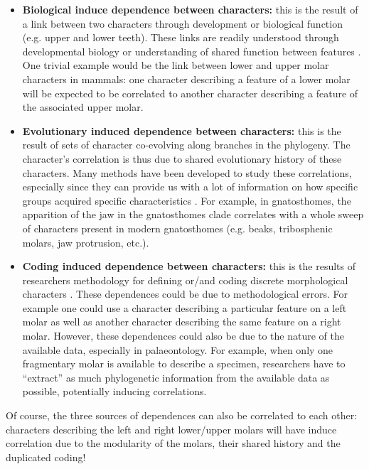 \documentclass[12pt,letterpaper]{article}
\begin{document}
\begin{itemize}
    \item \textbf{Biological induce dependence between characters:} this is the result of a link between two characters through development or biological function (e.g. upper and lower teeth).
    These links are readily understood through developmental biology or understanding of shared function between features \citep{goswami2006morphological,goswami2010,goswami2014macroevolutionary}.
    One trivial example would be the link between lower and upper molar characters in mammals: one character describing a feature of a lower molar will be expected to be correlated to another character describing a feature of the associated upper molar.

    \item \textbf{Evolutionary induced dependence between characters:} this is the result of sets of character co-evolving along branches in the phylogeny.
    The character's correlation is thus due to shared evolutionary history of these characters.
    Many methods have been developed to study these correlations, especially since they can provide us with a lot of information on how specific groups acquired specific characteristics \citep{Lande1983,Maddison1990,Pagel1994,Pagel2006,Grabowski2016}.
    For example, in gnatosthomes, the apparition of the jaw in the gnatosthomes clade correlates with a whole sweep of characters present in modern gnatosthomes (e.g. beaks, tribosphenic molars, jaw protrusion, etc.). %

    \item \textbf{Coding induced dependence between characters:} this is the results of researchers methodology for defining or/and coding discrete morphological characters \citep[see][and reference therein]{Brazeau2011}.
    These dependences could be due to methodological errors. 
    For example one could use a character describing a particular feature on a left molar as well as another character describing the same feature on a right molar.
    However, these dependences could also be due to the nature of the available data, especially in palaeontology.
    For example, when only one fragmentary molar is available to describe a specimen, researchers have to ``extract'' as much phylogenetic information from the available data as possible, potentially inducing correlations.
\end{itemize}

\noindent Of course, the three sources of dependences can also be correlated to each other: characters describing the left and right lower/upper molars will have induce correlation due to the modularity of the molars, their shared history and the duplicated coding!
\end{document}
